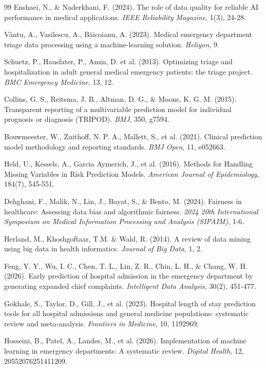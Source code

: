 \documentclass[harvard,article]{frontiersinFPHY_FAMS}
\begin{document}
\begin{thebibliography}{99}
 Enshaei, N., \& Naderkhani, F. (2024). The role of data quality for reliable AI performance in medical applications. \textit{IEEE Reliability Magazine}, 1(3), 24-28.

 Vântu, A., Vasilescu, A., Băicoianu, A. (2023). Medical emergency department triage data processing using a machine-learning solution. \textit{Heliyon}, 9.

 Schuetz, P., Hausfater, P., Amin, D. et al. (2013). Optimizing triage and hospitalization in adult general medical emergency patients: the triage project. \textit{BMC Emergency Medicine}, 13, 12.

 Collins, G. S., Reitsma, J. B., Altman, D. G., \& Moons, K. G. M. (2015). Transparent reporting of a multivariable prediction model for individual prognosis or diagnosis (TRIPOD). \textit{BMJ}, 350, g7594.

 Bouwmeester, W., Zuithoff, N. P. A., Mallett, S., et al. (2021). Clinical prediction model methodology and reporting standards. \textit{BMJ Open}, 11, e052663.

 Held, U., Kessels, A., Garcia Aymerich, J., et al. (2016). Methods for Handling Missing Variables in Risk Prediction Models. \textit{American Journal of Epidemiology}, 184(7), 545-551.

 Dehghani, F., Malik, N., Lin, J., Bayat, S., \& Bento, M. (2024). Fairness in healthcare: Assessing data bias and algorithmic fairness. \textit{2024 20th International Symposium on Medical Information Processing and Analysis (SIPAIM)}, 1-6.

 Herland, M., Khoshgoftaar, T.M. \& Wald, R. (2014). A review of data mining using big data in health informatics. \textit{Journal of Big Data}, 1, 2.

 Feng, Y. Y., Wu, I. C., Chen, T. L., Lin, Z. R., Chin, L. H., \& Chang, W. H. (2026). Early prediction of hospital admission in the emergency department by generating expanded chief complaints. \textit{Intelligent Data Analysis}, 30(2), 451-477.

 Gokhale, S., Taylor, D., Gill, J., et al. (2023). Hospital length of stay prediction tools for all hospital admissions and general medicine populations: systematic review and meta-analysis. \textit{Frontiers in Medicine}, 10, 1192969.

 Hosseini, B., Patel, A., Landes, M., et al. (2026). Implementation of machine learning in emergency departments: A systematic review. \textit{Digital Health}, 12, 20552076251411209.


\end{thebibliography}
\end{document}
